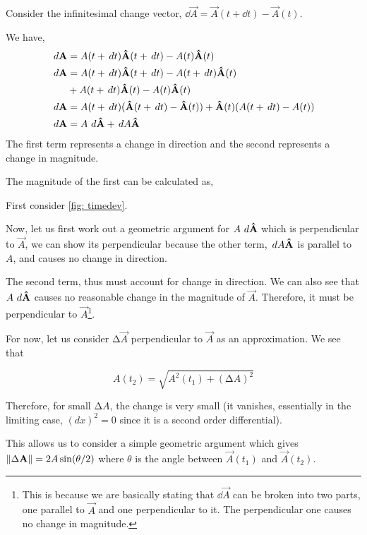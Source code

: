 \begin{example}
    Consider the infinitesimal change vector, \(\dd{\vec{A}} = \vec{A}(t + \dd{t}) - \vec{A}(t)\).
    
    We have, 
    \begin{align*}
        \mathop{}{d}{\boldsymbol{\mathbf{A}}} &= A(t + \mathop{}{d}{t})\boldsymbol{\mathbf{\hat{A}}}(t + \mathop{}{d}{t}) - A(t)\boldsymbol{\mathbf{\hat{A}}}(t) \\
        \mathop{}{d}{\boldsymbol{\mathbf{A}}} &= A(t + \mathop{}{d}{t})\boldsymbol{\mathbf{\hat{A}}}(t + \mathop{}{d}{t}) - A(t + \mathop{}{d}{t})\boldsymbol{\mathbf{\hat{A}}}(t) \\ 
        & + A(t + \mathop{}{d}{t})\boldsymbol{\mathbf{\hat{A}}}(t) - A(t)\boldsymbol{\mathbf{\hat{A}}}(t) \\
        \mathop{}{d}{\boldsymbol{\mathbf{A}}} &= A(t + \mathop{}{d}{t})(\boldsymbol{\mathbf{\hat{A}}}(t + \mathop{}{d}{t}) - \boldsymbol{\mathbf{\hat{A}}}(t)) + \boldsymbol{\mathbf{\hat{A}}}(t)(A(t + \mathop{}{d}{t}) - A(t)) \\
        \mathop{}{d}{\boldsymbol{\mathbf{A}}} &= A\mathop{}{d}{\boldsymbol{\mathbf{\hat{A}}}} + \mathop{}{d}{A}\boldsymbol{\mathbf{\hat{A}}} 
    \end{align*}
The first term represents a change in direction and the second represents a change in 
magnitude.
\end{example}

The magnitude of the first can be calculated as,

First consider \cref{fig: timedev}.

Now, let us first work out a geometric argument for \(A\mathop{}{d}{\boldsymbol{\mathbf{\hat{A}}}}\)
which is perpendicular to \(\vec{A}\), we can show its perpendicular because 
the other term, \(\mathop{}{d}{A} \boldsymbol{\mathbf{\hat{A}}}\) is parallel to \(A\), and causes no change in direction. 

The second term, thus must account for change in direction. We can also see that \(A\mathop{}{d}{\boldsymbol{\mathbf{\hat{A}}}}\)
causes no reasonable change in the magnitude of \(\vec{A}\). Therefore, it must be perpendicular to \(\vec{A}\)\footnote{This is because we are basically stating that \(\dd{\vec{A}}\) can be broken into two parts,
one parallel to \(\vec{A}\) and one perpendicular to it. The perpendicular one causes 
no change in magnitude.}.

For now, let us consider \(\increment \vec{A}\) perpendicular to \(\vec{A}\) as an approximation. We see that 

\begin{equation*}
    A(t_2) = \sqrt{A^2(t_1) + (\increment A)^2}
\end{equation*}

Therefore, for small \(\increment A\), the change is very small (it vanishes, essentially 
in the limiting case, \((dx)^2 = 0\) since it is a second order differential).

This allows us to consider a simple geometric argument which gives \(\norm{\Delta \boldsymbol{\mathbf{A}}} = 2A\sin(\theta/2)\)
where \(\theta\) is the angle between \(\vec{A}(t_1)\) and \(\vec{A}(t_2)\).

